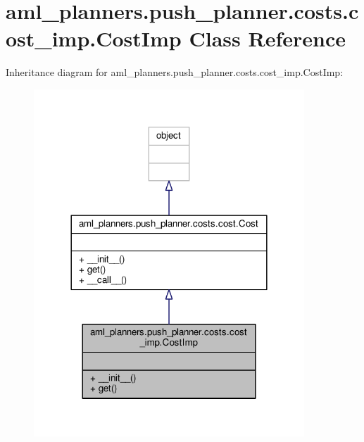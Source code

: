 \hypertarget{classaml__planners_1_1push__planner_1_1costs_1_1cost__imp_1_1_cost_imp}{\section{aml\-\_\-planners.\-push\-\_\-planner.\-costs.\-cost\-\_\-imp.\-Cost\-Imp Class Reference}
\label{classaml__planners_1_1push__planner_1_1costs_1_1cost__imp_1_1_cost_imp}
}


Inheritance diagram for aml\-\_\-planners.\-push\-\_\-planner.\-costs.\-cost\-\_\-imp.\-Cost\-Imp\-:
\nopagebreak
\begin{figure}[H]
\begin{center}
\leavevmode
\includegraphics[width=288pt]{classaml__planners_1_1push__planner_1_1costs_1_1cost__imp_1_1_cost_imp__inherit__graph}
\end{center}
\end{figure}


